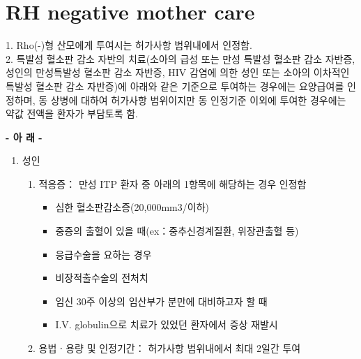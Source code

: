 \section{RH negative mother care}
{
\par
1. Rho(-)형 산모에게 투여시는 허가사항 범위내에서 인정함.\\ 
2. 특발성 혈소판 감소 자반의 치료(소아의 급성 또는 만성 특발성 혈소판 감소 자반증, 성인의 만성특발성 혈소판 감소 자반증, HIV 감염에 의한 성인 또는 소아의 이차적인 특발성 혈소판 감소 자반증)에 아래와 같은 기준으로 투여하는 경우에는 요양급여를 인정하며, 동 상병에 대하여 허가사항 범위이지만 동 인정기준 이외에 투여한 경우에는 약값 전액을 환자가 부담토록 함.\\ 
\begin{center}\textbf{- 아 래 -}\end{center}
\begin{enumerate}[가.]\tightlist
\item 성인 
	\begin{enumerate}[(가)]\tightlist
	\item 적응증： 만성 ITP 환자 중 아래의 1항목에 해당하는 경우 인정함 
		\begin{itemize}\tightlist
		\item 심한 혈소판감소증(20,000mm3/이하) 
		\item 중증의 출혈이 있을 때(ex：중추신경계질환, 위장관출혈 등) 
		\item 응급수술을 요하는 경우 
		\item 비장적출수술의 전처치 
		\item 임신 30주 이상의 임산부가 분만에 대비하고자 할 때 
		\item I.V. globulin으로 치료가 있었던 환자에서 증상 재발시 
		\end{itemize}
	\item 용법ㆍ용량 및 인정기간： 허가사항 범위내에서 최대 2일간 투여

\end{enumerate}
\end{enumerate}}

